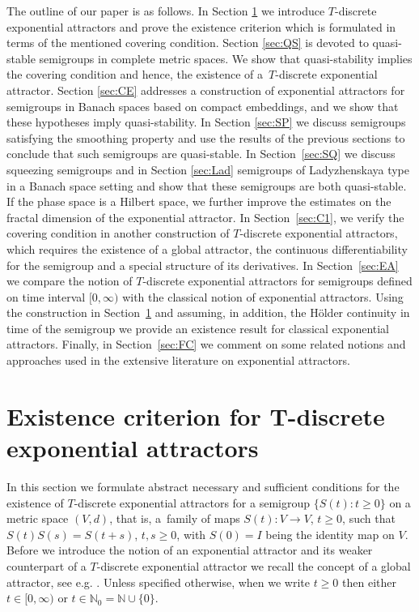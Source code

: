 \documentclass[a4paper,12pt,reqno]{amsart}
\theoremstyle{plain}
\theoremstyle{definition}
\numberwithin{equation}{section}
\newcommand{\N}{\mathbb{N}}
\renewcommand{\geq}{\geqslant}
\begin{document}
The outline of our paper is as follows.
In Section \ref{sec:EXPO} we introduce  $T$-discrete exponential attractors and prove the existence criterion which is formulated in terms of the mentioned covering condition. Section \ref{sec:QS}  is devoted to quasi-stable semigroups in complete metric spaces. We show that quasi-stability implies the covering condition and hence, the existence of a~$T$-discrete exponential attractor.  
Section \ref{sec:CE} addresses a construction of exponential attractors for semigroups in Banach spaces based on compact embeddings, and we show that these hypotheses imply quasi-stability. 
In Section \ref{sec:SP} we discuss semigroups satisfying the smoothing property and use the results of the previous sections to conclude that such semigroups are quasi-stable. 
In Section~\ref{sec:SQ} we discuss squeezing semigroups and in Section \ref{sec:Lad} semigroups of Ladyzhenskaya type  
in a Banach space setting  and show that these semigroups are both quasi-stable. If the phase space is a Hilbert space, we further improve the estimates on the fractal dimension of the exponential attractor. 
In Section~\ref{sec:C1}, we verify the covering condition in another construction of $T$-discrete exponential attractors, which requires
the existence of a global attractor, the continuous differentiability for the semigroup and a special structure of its derivatives.  
In Section~\ref{sec:EA} we compare the notion of $T$-discrete exponential attractors for semigroups defined on time interval $[0,\infty)$ with the classical notion of exponential attractors. Using the construction in Section~\ref{sec:EXPO} and 
assuming, in addition, the H\"older continuity in time of the semigroup we provide an existence result for classical exponential attractors. Finally, in Section~\ref{sec:FC} we comment on some related notions and approaches used in the extensive literature on exponential attractors.

\section{Existence criterion for T-discrete exponential attractors}\label{sec:EXPO}

In this section we formulate abstract necessary and sufficient conditions for the existence of $T$-discrete exponential attractors for a semigroup $\{S(t)\colon t\geq 0\}$ on a metric space $(V,d)$, that is, a~family of maps $S(t)\colon V\to V$, $t\geq 0$, such that $S(t)S(s)=S(t+s)$, $t,s\geq 0$, with $S(0)=I$ being the identity map on $V$. Before we introduce the notion of an exponential attractor and its weaker counterpart of a $T$-discrete exponential attractor  we recall the concept of a global attractor, see e.g. \cite{Hale88, Lad91, C-D00}. Unless specified otherwise, when we write $t\geq 0$ then either $t\in[0,\infty)$ or  $t\in \N_0=\N\cup\{0\}$.
\end{document}
